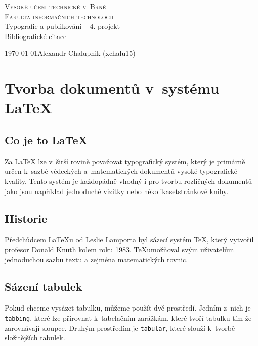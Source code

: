 \documentclass[11pt, a4paper]{article}
\begin{document}
\begin{titlepage}
    \begin{center}
        \Huge{\textsc{Vysoké učení technické v~Brně}}\\
        \huge{\textsc{Fakulta informačních technologií}}\\
        \LARGE{Typografie a publikování -- 4. projekt}\\
        \Huge{Bibliografické citace}\\
    \end{center}
    {\Large \today \hfill Alexandr Chalupnik (xchalu15)}
\end{titlepage}

\section{Tvorba dokumentů v~systému \LaTeX{}}
\subsection{Co je to \LaTeX{}}
Za LaTeX lze v~širší rovině považovat typografický systém, který je primárně určen k~sazbě vědeckých a~matematických dokumentů vysoké typografické kvality. Tento systém je každopádně vhodný i pro tvorbu rozličných dokumentů jako jsou například jednoduché vizitky nebo několikasetstránkové knihy.\cite{web:medium}

\subsection{Historie}
Předchůdcem \LaTeX{}u od Leslie Lamporta byl sázecí systém \TeX, který vytvořil profesor Donald Knuth kolem roku 1983. \TeX umožňoval svým uživatelům jednoduchou sazbu textu a zejména matematických rovnic. \cite{thesis:history} 

\subsection{Sázení tabulek}
Pokud chceme vysázet tabulku, můžeme použít dvě prostředí. Jedním z~nich je \verb|tabbing|, které lze přirovnat k~tabelačním zarážkám, které tvoří tabulku tím že zarovnávají sloupce. Druhým prostředím je \verb|tabular|, které slouží k~tvorbě složitějších tabulek. \cite{web:table}
\end{document}
